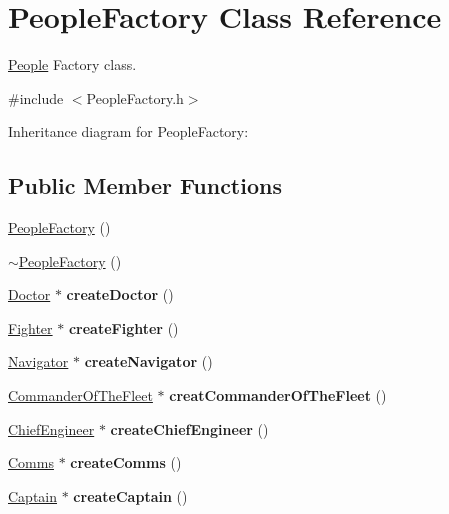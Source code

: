 \hypertarget{classPeopleFactory}{}\section{People\+Factory Class Reference}
\label{classPeopleFactory}


\hyperlink{classPeople}{People} Factory class.  




{\ttfamily \#include $<$People\+Factory.\+h$>$}



Inheritance diagram for People\+Factory\+:
\subsection*{Public Member Functions}
\begin{DoxyCompactItemize}
\item 
\hyperlink{classPeopleFactory_a937ce020364a355d6689c365ba70f0d6}{People\+Factory} ()
\item 
\hyperlink{classPeopleFactory_a18d1aec526ba93ca84cde1c25cfb8944}{$\sim$\+People\+Factory} ()
\item 
\mbox{\label{classPeopleFactory_ab0df667c6861d2e0bd88fe93bc408369}} 
\hyperlink{classDoctor}{Doctor} $\ast$ {\bfseries create\+Doctor} ()
\item 
\mbox{\label{classPeopleFactory_a44d146ee64cdd08fe94fd37147a9380b}} 
\hyperlink{classFighter}{Fighter} $\ast$ {\bfseries create\+Fighter} ()
\item 
\mbox{\label{classPeopleFactory_a2714fe4ae754589942d3b404a8b22a03}} 
\hyperlink{classNavigator}{Navigator} $\ast$ {\bfseries create\+Navigator} ()
\item 
\mbox{\label{classPeopleFactory_ab37242e8750e64611da5e1579373151d}} 
\hyperlink{classCommanderOfTheFleet}{Commander\+Of\+The\+Fleet} $\ast$ {\bfseries creat\+Commander\+Of\+The\+Fleet} ()
\item 
\mbox{\label{classPeopleFactory_a1762067d20aa624ebe511bdf520d7b9f}} 
\hyperlink{classChiefEngineer}{Chief\+Engineer} $\ast$ {\bfseries create\+Chief\+Engineer} ()
\item 
\mbox{\label{classPeopleFactory_a8c7065ad400bfc8fd1d89b591f976f57}} 
\hyperlink{classComms}{Comms} $\ast$ {\bfseries create\+Comms} ()
\item 
\mbox{\label{classPeopleFactory_a9b4c26dbcaa744e26e47c779c71069cf}} 
\hyperlink{classCaptain}{Captain} $\ast$ {\bfseries create\+Captain} ()
\end{DoxyCompactItemize}


